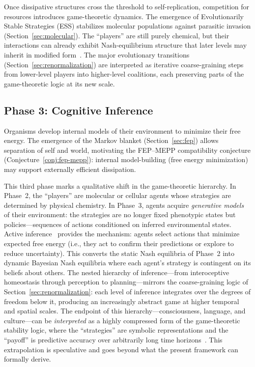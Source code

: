 \documentclass[12pt,a4paper]{article}
\theoremstyle{remark}
\begin{document}
Once dissipative structures cross the threshold to self-replication, competition for resources introduces game-theoretic dynamics. The emergence of Evolutionarily Stable Strategies (ESS) stabilizes molecular populations against parasitic invasion (Section~\ref{sec:molecular}). The ``players'' are still purely chemical, but their interactions can already exhibit Nash-equilibrium structure that later levels may inherit in modified form~\citep{MaynardSmithPrice1973}. The major evolutionary transitions (Section~\ref{sec:renormalization}) are interpreted as iterative coarse-graining steps from lower-level players into higher-level coalitions, each preserving parts of the game-theoretic logic at its new scale.

\subsection{Phase 3: Cognitive Inference}

Organisms develop internal models of their environment to minimize their free energy. The emergence of the Markov blanket (Section~\ref{sec:fep}) allows separation of self and world, motivating the FEP--MEPP compatibility conjecture (Conjecture~\ref{conj:fep-mepp}): internal model-building (free energy minimization) may support externally efficient dissipation.

This third phase marks a qualitative shift in the game-theoretic hierarchy. In Phase~2, the ``players'' are molecular or cellular agents whose strategies are determined by physical chemistry. In Phase~3, agents acquire \emph{generative models} of their environment: the strategies are no longer fixed phenotypic states but policies---sequences of actions conditioned on inferred environmental states. Active inference~\citep{FristonFreeEnergy} provides the mechanism: agents select actions that minimize expected free energy (i.e., they act to confirm their predictions or explore to reduce uncertainty). This converts the static Nash equilibria of Phase~2 into dynamic Bayesian Nash equilibria where each agent's strategy is contingent on its beliefs about others. The nested hierarchy of inference---from interoceptive homeostasis through perception to planning---mirrors the coarse-graining logic of Section~\ref{sec:renormalization}: each level of inference integrates over the degrees of freedom below it, producing an increasingly abstract game at higher temporal and spatial scales. The endpoint of this hierarchy---consciousness, language, and culture---can be \emph{interpreted} as a highly compressed form of the game-theoretic stability logic, where the ``strategies'' are symbolic representations and the ``payoff'' is predictive accuracy over arbitrarily long time horizons~\citep{FristonPDF}. This extrapolation is speculative and goes beyond what the present framework can formally derive.
\end{document}
